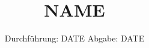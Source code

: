 

\subject{Versuchsnummer: NUMBER}
\title{NAME}
\date{%
  Durchführung: DATE
  \hspace{3em}
  Abgabe: DATE
}



\maketitle
\thispagestyle{empty}
\tableofcontents
\newpage




\newpage
\nocite{*}
\printbibliography



